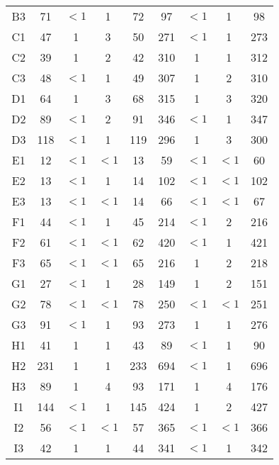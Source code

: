 \begin{center}
\begin{longtable}{ccccc|cccc}
    B3    & 71    & $<1$     & 1     & 72    & 97    & $<1$     & 1     & 98 \\
    C1    & 47    & 1     & 3     & 50    & 271   & $<1$     & 1     & 273 \\
    C2    & 39    & 1     & 2     & 42    & 310   & 1     & 1     & 312 \\
    C3    & 48    & $<1$     & 1     & 49    & 307   & 1     & 2     & 310 \\
    D1    & 64    & 1     & 3     & 68    & 315   & 1     & 3     & 320 \\
    D2    & 89    & $<1$     & 2     & 91    & 346   & $<1$     & 1     & 347 \\
    D3    & 118   & $<1$     & 1     & 119   & 296   & 1     & 3     & 300 \\
    E1    & 12    & $<1$     & $<1$     & 13    & 59    & $<1$     & $<1$     & 60 \\
    E2    & 13    & $<1$     & 1     & 14    & 102   & $<1$     & $<1$     & 102 \\
    E3    & 13    & $<1$     & $<1$     & 14    & 66    & $<1$     & $<1$     & 67 \\
    F1    & 44    & $<1$     & 1     & 45    & 214   & $<1$     & 2     & 216 \\
    F2    & 61    & $<1$     & $<1$     & 62    & 420   & $<1$     & 1     & 421 \\
    F3    & 65    & $<1$     & $<1$     & 65    & 216   & 1     & 2     & 218 \\
    G1    & 27    & $<1$     & 1     & 28    & 149   & 1     & 2     & 151 \\
    G2    & 78    & $<1$     & $<1$     & 78    & 250   & $<1$     & $<1$     & 251 \\
    G3    & 91    & $<1$     & 1     & 93    & 273   & 1     & 1     & 276 \\
    H1    & 41    & 1     & 1     & 43    & 89    & $<1$     & 1     & 90 \\
    H2    & 231   & 1     & 1     & 233   & 694   & $<1$     & 1     & 696 \\
    H3    & 89    & 1     & 4     & 93    & 171   & 1     & 4     & 176 \\
    I1    & 144   & $<1$     & 1     & 145   & 424   & 1     & 2     & 427 \\
    I2    & 56    & $<1$     & $<1$     & 57    & 365   & $<1$     & $<1$     & 366 \\
    I3    & 42    & 1     & 1     & 44    & 341   & $<1$     & 1     & 342 \\

\end{longtable}
\end{center}
